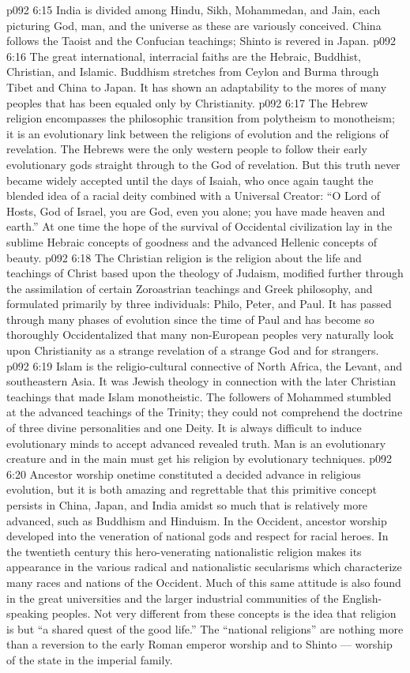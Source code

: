 \vs p092 6:15 India is divided among Hindu, Sikh, Mohammedan, and Jain, each picturing God, man, and the universe as these are variously conceived. China follows the Taoist and the Confucian teachings; Shinto is revered in Japan.
\vs p092 6:16 The great international, interracial faiths are the Hebraic, Buddhist, Christian, and Islamic. Buddhism stretches from Ceylon and Burma through Tibet and China to Japan. It has shown an adaptability to the mores of many peoples that has been equaled only by Christianity.
\vs p092 6:17 The Hebrew religion encompasses the philosophic transition from polytheism to monotheism; it is an evolutionary link between the religions of evolution and the religions of revelation. The Hebrews were the only western people to follow their early evolutionary gods straight through to the God of revelation. But this truth never became widely accepted until the days of Isaiah, who once again taught the blended idea of a racial deity combined with a Universal Creator: “O Lord of Hosts, God of Israel, you are God, even you alone; you have made heaven and earth.” At one time the hope of the survival of Occidental civilization lay in the sublime Hebraic concepts of goodness and the advanced Hellenic concepts of beauty.
\vs p092 6:18 The Christian religion is the religion about the life and teachings of Christ based upon the theology of Judaism, modified further through the assimilation of certain Zoroastrian teachings and Greek philosophy, and formulated primarily by three individuals: Philo, Peter, and Paul. It has passed through many phases of evolution since the time of Paul and has become so thoroughly Occidentalized that many non\hyp{}European peoples very naturally look upon Christianity as a strange revelation of a strange God and for strangers.
\vs p092 6:19 Islam is the religio\hyp{}cultural connective of North Africa, the Levant, and southeastern Asia. It was Jewish theology in connection with the later Christian teachings that made Islam monotheistic. The followers of Mohammed stumbled at the advanced teachings of the Trinity; they could not comprehend the doctrine of three divine personalities and one Deity. It is always difficult to induce evolutionary minds  to accept advanced revealed truth. Man is an evolutionary creature and in the main must get his religion by evolutionary techniques.
\vs p092 6:20 \pc Ancestor worship onetime constituted a decided advance in religious evolution, but it is both amazing and regrettable that this primitive concept persists in China, Japan, and India amidst so much that is relatively more advanced, such as Buddhism and Hinduism. In the Occident, ancestor worship developed into the veneration of national gods and respect for racial heroes. In the twentieth century this hero\hyp{}venerating nationalistic religion makes its appearance in the various radical and nationalistic secularisms which characterize many races and nations of the Occident. Much of this same attitude is also found in the great universities and the larger industrial communities of the English\hyp{}speaking peoples. Not very different from these concepts is the idea that religion is but “a shared quest of the good life.” The “national religions” are nothing more than a reversion to the early Roman emperor worship and to Shinto --- worship of the state in the imperial family.

